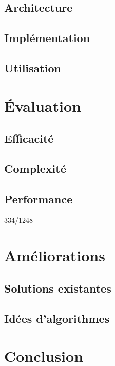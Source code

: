 \documentclass{article}
\begin{document}
\subsection{Architecture}

\subsection{Implémentation}

\subsection{Utilisation}

\section{Évaluation}

\subsection{Efficacité}

\subsection{Complexité}

\subsection{Performance}
334/1248

\section{Améliorations}

\subsection{Solutions existantes}

\subsection{Idées d'algorithmes}



\section*{Conclusion}
\end{document}
